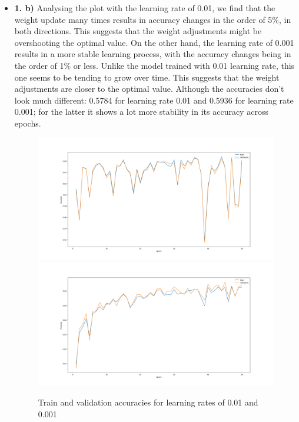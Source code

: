 \documentclass[12pt]{article}
\begin{document}
\begin{itemize}
    \item \textbf{1. b)} Analysing the plot with the learning rate of 0.01, we find that the weight update many times results in accuracy changes in the order of 5\%, in both directions. This suggests that the weight adjustments might be overshooting the optimal value. On the other hand, the learning rate of 0.001 results in a more stable learning process, with the accuracy changes being in the order of 1\% or less. Unlike the model trained with 0.01 learning rate, this one seems to be tending to grow over time. This suggests that the weight adjustments are closer to the optimal value. Although the accuracies don't look much different: 0.5784 for learning rate 0.01 and 0.5936 for learning rate 0.001; for the latter it shows a lot more stability in its accuracy across epochs.
    \begin{figure}[H]
        \centering
        \includegraphics[width=1\linewidth]{../outputs/hw1-q1-1b.01.png}
        \includegraphics[width=1\linewidth]{../outputs/hw1-q1-1b.001.png}
        \caption{Train and validation accuracies for learning rates of 0.01 and 0.001}
        \label{fig:1b}
    \end{figure}
    \begin{figure}[H]

\end{figure}
\end{itemize}
\end{document}
